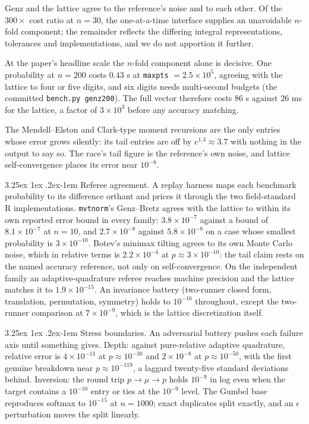 \documentclass[11pt]{article}
\makeatletter
\renewcommand\paragraph{\@startsection{paragraph}{4}{\z@}%
  {3.25ex \@plus1ex \@minus.2ex}{-1em}%
  {\normalfont\normalsize\itshape}}
\makeatother
\begin{document}
Genz and the lattice agree to the reference's noise and to each other.
Of the $300\times$ cost ratio at $n=30$, the one-at-a-time interface
supplies an unavoidable $n$-fold component; the remainder reflects the
differing integral representations, tolerances and implementations, and
we do not apportion it further.

At the paper's headline scale the $n$-fold component alone is decisive.
One probability at $n=200$ costs $0.43$ s at \texttt{maxpts}
$=2.5\times10^{5}$, agreeing with the lattice to four or five digits, and
six digits needs multi-second budgets (the committed \texttt{bench.py
genz200}). The full vector therefore costs $86$ s against $26$ ms for the
lattice, a factor of $3\times10^{3}$ before any accuracy matching.

The Mendell--Elston and Clark-type moment recursions are the only
entries whose error grows
silently: its tail entries are off by $e^{1.3}\approx3.7$ with nothing in
the output to say so. The race's tail figure is the reference's own
noise, and lattice self-convergence places its error near $10^{-8}$.

\paragraph{Referee agreement.} A replay harness maps each benchmark
probability to its difference orthant and prices it through the two
field-standard R implementations. \texttt{mvtnorm}'s Genz--Bretz agrees with
the lattice to within its own reported error bound in every family:
$3.8\times10^{-7}$ against a bound of $8.1\times10^{-7}$ at $n=10$, and
$2.7\times10^{-8}$ against $5.8\times10^{-8}$ on a case whose smallest
probability is $3\times10^{-10}$. Botev's minimax tilting agrees to its own
Monte Carlo noise, which in relative terms is $2.2\times10^{-4}$ at
$p\approx3\times10^{-10}$: the tail claim rests on the named accuracy
reference, not only on self-convergence. On the independent family an
adaptive-quadrature referee reaches machine precision and the lattice matches
it to $1.9\times10^{-15}$. An invariance battery (two-runner closed form,
translation, permutation, symmetry) holds to $10^{-16}$ throughout, except
the two-runner comparison at $7\times10^{-9}$, which is the lattice
discretization itself.

\paragraph{Stress boundaries.} An adversarial battery pushes each failure
axis until something gives. Depth: against pure-relative adaptive
quadrature, relative error is $4\times10^{-13}$ at $p\approx10^{-30}$ and
$2\times10^{-8}$ at $p\approx10^{-50}$, with the first genuine breakdown
near $p\approx10^{-119}$, a laggard twenty-five standard deviations behind.
Inversion: the round trip $p\to\mu\to p$ holds $10^{-9}$ in log even when
the target contains a $10^{-10}$ entry or ties at the $10^{-9}$ level. The
Gumbel base reproduces softmax to $10^{-15}$ at $n=1000$; exact duplicates
split exactly, and an $\epsilon$ perturbation moves the split linearly.
\end{document}
